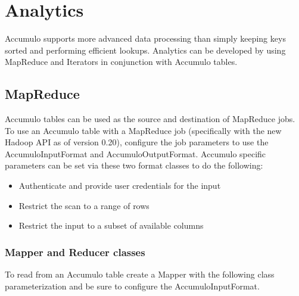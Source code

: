 
%
%

\chapter{Analytics}

Accumulo supports more advanced data processing than simply keeping keys
sorted and performing efficient lookups. Analytics can be developed by using
MapReduce and Iterators in conjunction with Accumulo tables.

\section{MapReduce}

Accumulo tables can be used as the source and destination of MapReduce jobs. To
use an Accumulo table with a MapReduce job (specifically with the new Hadoop API
as of version 0.20), configure the job parameters to use the AccumuloInputFormat
and AccumuloOutputFormat. Accumulo specific parameters can be set via these
two format classes to do the following:
\begin{itemize}
\item{Authenticate and provide user credentials for the input}
\item{Restrict the scan to a range of rows}
\item{Restrict the input to a subset of available columns}
\end{itemize}

\subsection{Mapper and Reducer classes}

To read from an Accumulo table create a Mapper with the following class
parameterization and be sure to configure the AccumuloInputFormat.

